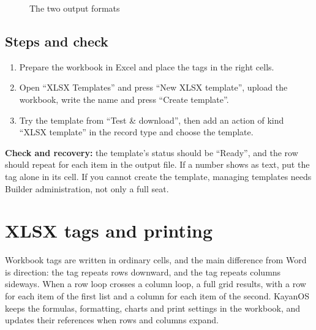 \begin{figure}[H]
\centering
{}
\rclegend
\caption{The two output formats}
\label{fig:builder-xlsx-outputs}
\end{figure}

\subsection{Steps and check}
\begin{enumerate}
\item Prepare the workbook in Excel and place the tags in the right cells.
\item Open “XLSX Templates” and press “New XLSX template”, upload the workbook, write the name and press “Create template”.
\item Try the template from “Test \& download”, then add an action of kind “XLSX template” in the record type and choose the template.
\end{enumerate}

\textbf{Check and recovery:} the template's status should be “Ready”, and the row should repeat for each item in the output file. If a number shows as text, put the tag alone in its cell. If you cannot create the template, managing templates needs Builder administration, not only a full seat.

\clearpage
\section{XLSX tags and printing}
\label{sec:builder-feature-xlsx-tags}

Workbook tags are written in ordinary cells, and the main difference from Word is direction: the  tag repeats rows downward, and the  tag repeats columns sideways. When a row loop crosses a column loop, a full grid results, with a row for each item of the first list and a column for each item of the second. KayanOS keeps the formulas, formatting, charts and print settings in the workbook, and updates their references when rows and columns expand.

